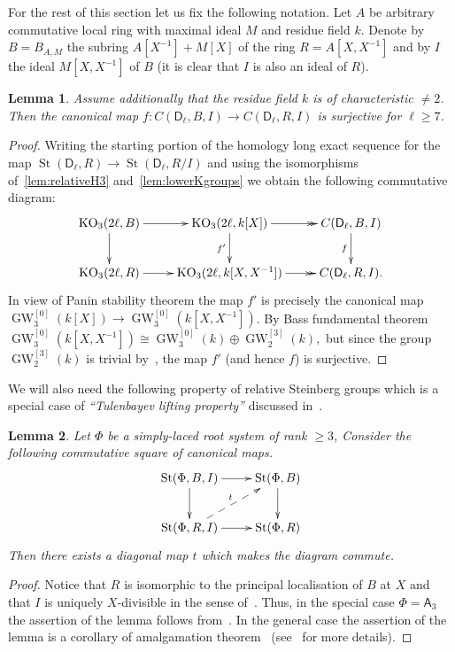 \documentclass[oneside, 8pt]{amsart}
\newtheorem{lemma}{Lemma}
\theoremstyle{remark}
\theoremstyle{definition}
\numberwithin{lemma}{section}
\numberwithin{prop}{section}
\numberwithin{corollary}{section}
\DeclareMathOperator{\St}{St}
\DeclareMathOperator{\K}{K}
\DeclareMathOperator{\KO}{KO}
\DeclareMathOperator{\GW}{GW}
\newcommand{\rA}{\mathsf{A}}
\newcommand{\rD}{\mathsf{D}}
\numberwithin{equation}{section}
\begin{document}
For the rest of this section let us fix the following notation.
Let $A$ be arbitrary commutative local ring with maximal ideal $M$ and residue field $k$.
Denote by $B = B_{A, M}$ the subring $A[X^{-1}] + M[X]$ of the ring $R = A[X, X^{-1}]$ and
by $I$ the ideal $M[X, X^{-1}]$ of $B$ (it is clear that $I$ is also an ideal of $R$).

\begin{lemma} \label{lem:prop41}
Assume additionally that the residue field $k$ is of characteristic $\neq 2$.
Then the canonical map $f\colon C(\rD_\ell, B, I) \to C(\rD_\ell, R, I)$ is surjective for $\ell \geq 7$. \end{lemma}
\begin{proof}
Writing the starting portion of the homology long exact sequence for the map $\St(\rD_\ell, R) \to \St(\rD_\ell, R/I)$ 
and using the isomorphisms of~\cref{lem:relativeH3} and~\cref{lem:lowerKgroups} we obtain the following commutative diagram:
\begin{equation*}\xymatrix{
 \KO_3(2\ell, B) \ar[r] \ar[d] & \KO_3(2\ell, k[X]) \ar[d]_{f'} \ar@{->>}[r] & \ar[d]_{f} C(\rD_\ell, B, I) \\
 \KO_3(2\ell, R) \ar[r]        & \KO_3(2\ell, k[X, X^{-1}]) \ar@{->>}[r]        & C(\rD_\ell, R, I).}\end{equation*}
In view of Panin stability theorem the map $f'$ is precisely the canonical map $\GW_3^{[0]}(k[X]) \to \GW_3^{[0]}(k[X, X^{-1}])$.
By Bass fundamental theorem $\GW_3^{[0]}(k[X, X^{-1}]) \cong \GW_3^{[0]}(k) \oplus \GW_2^{[3]}(k),$
but since the group $\GW_2^{[3]}(k)$ is trivial by~\cite[Lemma~2.2]{FRS12}, the map $f'$ (and hence $f$) is surjective.
\end{proof} 
 
We will also need the following property of relative Steinberg groups which is a special case of {\it ``Tulenbayev lifting property''} discussed in~\cite[\S~2]{LS17}.
\begin{lemma}\label{lem:lemma32} Let $\Phi$ be a simply-laced root system of rank $\geq 3$,
Consider the following commutative square of canonical maps.
\[ \xymatrix{
    \St(\Phi, B, I) \ar[r] \ar[d] & \St(\Phi, B) \ar[d] \\
    \St(\Phi, R, I) \ar[r] \ar@{-->}^t[ur] & \St(\Phi, R) } \]
Then there exists a diagonal map $t$ which makes the diagram commute.   
\end{lemma} 
\begin{proof}
 Notice that $R$ is isomorphic to the principal localisation of $B$ at $X$
  and that $I$ is uniquely $X$-divisible in the sense of~\cite[\S~4]{LS17}.
 Thus, in the special case $\Phi = \rA_3$ the assertion of the lemma follows from~\cite[Theorem~3]{LS17}.
 In the general case the assertion of the lemma is a corollary of amalgamation theorem~\cite[Theorem~9]{S15} 
  (see~\cite[\S~2]{LS17} for more details).
\end{proof}
\end{document}
